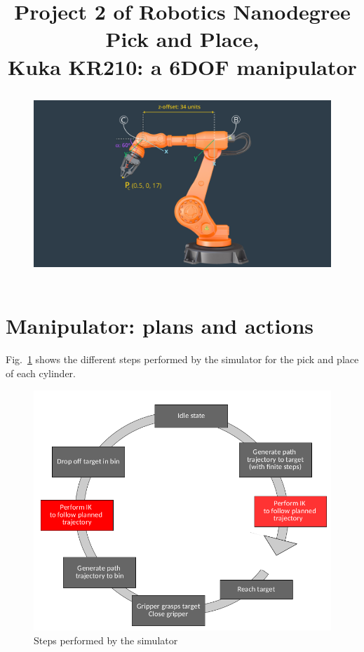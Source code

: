 \documentclass[a4paper,12pt]{report}
\begin{document}
\title{Project 2 of Robotics Nanodegree \\
Pick and Place,  \\
Kuka KR210: a 6DOF manipulator
\begin{figure}[H]
\centering
        \includegraphics[totalheight=9cm]{imgs/arm-step-1.png}
\end{figure}}
\maketitle
\section{Manipulator: plans and actions}
Fig.~\ref{fig:steps} shows the different steps performed by the simulator for the pick and place of each cylinder.


\begin{figure}[H]
\centering
       \includegraphics[totalheight=12cm]{imgs/steps.png}
       \caption{Steps performed by the simulator}
       \label{fig:steps}
\end{figure}
\end{document}
